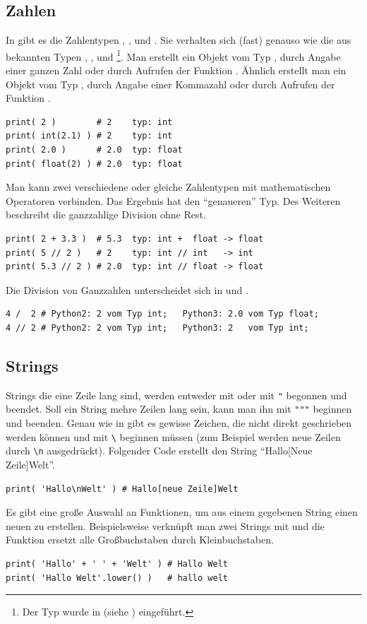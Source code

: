 \subsection{Zahlen}
\label{section:crashkurs:zahlen}
In \Python gibt es die Zahlentypen , ,  und .
Sie verhalten sich (fast) genauso wie die aus \CC bekannten Typen , ,  und %
\footnote{Der Typ  wurde in \CNeunundneunzig (siehe \cite{C99}) eingeführt.}.
Man erstellt ein Objekt vom Typ , durch Angabe einer ganzen Zahl oder durch Aufrufen der Funktion .
Ähnlich erstellt man ein Objekt vom Typ , durch Angabe einer Kommazahl oder durch Aufrufen der Funktion .
\begin{lstlisting}
print( 2 )        # 2    typ: int
print( int(2.1) ) # 2    typ: int
print( 2.0 )      # 2.0  typ: float
print( float(2) ) # 2.0  typ: float
\end{lstlisting}
Man kann zwei verschiedene oder gleiche Zahlentypen mit mathematischen Operatoren verbinden.
Das Ergebnis hat den ``genaueren'' Typ.
Des Weiteren beschreibt \lpy{//} die ganzzahlige Division ohne Rest.
\begin{lstlisting}
print( 2 + 3.3 )  # 5.3  typ: int +  float -> float
print( 5 // 2 )   # 2    typ: int // int   -> int
print( 5.3 // 2 ) # 2.0  typ: int // float -> float
\end{lstlisting}
Die Division von Ganzzahlen unterscheidet sich in \PythonZwei und \PythonDrei.
\begin{lstlisting}
4 /  2 # Python2: 2 vom Typ int;   Python3: 2.0 vom Typ float;
4 // 2 # Python2: 2 vom Typ int;   Python3: 2   vom Typ int;
\end{lstlisting}


\subsection{Strings}
\label{section:crashkurs:strings}
Strings die eine Zeile lang sind, werden entweder mit  oder mit \lstinline[style=PyInline]|"| begonnen und beendet.
Soll ein String mehre Zeilen lang sein, kann man ihn mit \lstinline[style=PyInline]|"""| beginnen und beenden.
Genau wie in \CC gibt es gewisse Zeichen, die nicht direkt geschrieben werden können und mit \lstinline[language=C++,style=CPP]|\| beginnen müssen (zum Beispiel werden neue Zeilen durch \lstinline[language=C++,style=CPP]|\n| ausgedrückt).
Folgender Code erstellt den String ``Hallo[Neue Zeile]Welt''.
\begin{lstlisting}
print( 'Hallo\nWelt' ) # Hallo[neue Zeile]Welt
\end{lstlisting}
Es gibt eine große Auswahl an Funktionen, um aus einem gegebenen String einen neuen zu erstellen.
Beispielsweise verknüpft man zwei Strings mit \lpy{+} und die Funktion  ersetzt alle Großbuchstaben durch Kleinbuchstaben.
\begin{lstlisting}
print( 'Hallo' + ' ' + 'Welt' ) # Hallo Welt
print( 'Hallo Welt'.lower() )   # hallo welt
\end{lstlisting}


